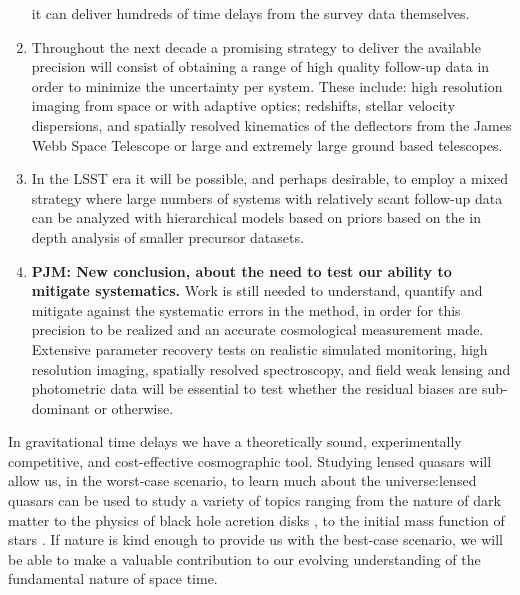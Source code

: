 \begin{enumerate}
it can deliver hundreds of time delays from the survey data themselves.
\item Throughout the next decade a promising strategy to deliver the
available precision will consist of obtaining a
range of high quality follow-up data in order to minimize the
uncertainty per system. These include: high resolution imaging from
space or with adaptive optics; redshifts, stellar velocity dispersions,
and spatially resolved kinematics of the deflectors from the James Webb
Space Telescope or large and extremely large ground based telescopes.
\item  In the LSST era it will be possible, and perhaps desirable,  to
employ a mixed strategy where large numbers of systems with relatively
scant follow-up data can be analyzed with hierarchical models based on
priors based on the in depth analysis of smaller precursor datasets.
\item {\bf PJM: New conclusion, about the need to test our ability to
mitigate systematics.} Work is still needed to understand, quantify and
mitigate against the systematic errors in  the method, in order for this
precision to be realized and an accurate cosmological measurement made.
Extensive parameter recovery tests on realistic simulated monitoring,
high resolution imaging, spatially resolved spectroscopy, and field weak
lensing and photometric data will be essential to test whether the
residual biases are sub-dominant or otherwise.
\end{enumerate}


%
%
In gravitational time delays we have a theoretically sound,
experimentally competitive, and cost-effective cosmographic tool.
%
Studying lensed
quasars will allow us, in the worst-case scenario, to learn much about
the universe:lensed quasars can be used to study a variety of topics
ranging from the nature of dark matter
\citep{Metcalf:2005p1203,Xu++09,Veg++14,Nie++14} to the physics of
black hole acretion disks \citep{PMK08,Blackburne:2010p6600}, to the
initial mass function of stars \citep{SCH++15}. If nature is kind
enough to provide us with the best-case scenario, we will be able to
make a valuable contribution to our evolving understanding of the
fundamental nature of space time.
